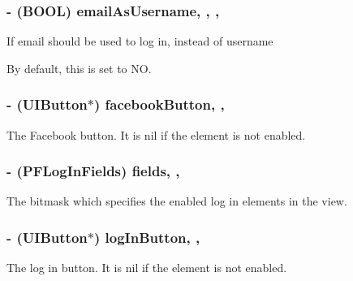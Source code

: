 \subsubsection[{email\+As\+Username}]{\setlength{\rightskip}{0pt plus 5cm}-\/ (B\+O\+O\+L) email\+As\+Username\hspace{0.3cm}{\ttfamily [read]}, {\ttfamily [write]}, {\ttfamily [nonatomic]}, {\ttfamily [assign]}}\label{interface_p_f_log_in_view_a5158167a0a95cdf25f18e5fe23a8368b}
If email should be used to log in, instead of username

By default, this is set to {\ttfamily N\+O}. \hypertarget{interface_p_f_log_in_view_afbed9acbbd4acf185fce057ab640ab23}{}
\subsubsection[{facebook\+Button}]{\setlength{\rightskip}{0pt plus 5cm}-\/ (U\+I\+Button$\ast$) facebook\+Button\hspace{0.3cm}{\ttfamily [read]}, {\ttfamily [nonatomic]}, {\ttfamily [strong]}}\label{interface_p_f_log_in_view_afbed9acbbd4acf185fce057ab640ab23}
The Facebook button. It is {\ttfamily nil} if the element is not enabled. \hypertarget{interface_p_f_log_in_view_a57c9766d511bca34b7f75fd4bd25a63d}{}
\subsubsection[{fields}]{\setlength{\rightskip}{0pt plus 5cm}-\/ (P\+F\+Log\+In\+Fields) fields\hspace{0.3cm}{\ttfamily [read]}, {\ttfamily [nonatomic]}, {\ttfamily [assign]}}\label{interface_p_f_log_in_view_a57c9766d511bca34b7f75fd4bd25a63d}
The bitmask which specifies the enabled log in elements in the view. \hypertarget{interface_p_f_log_in_view_afcadd6b2ccea1a5f06cd82c79dd675f0}{}
\subsubsection[{log\+In\+Button}]{\setlength{\rightskip}{0pt plus 5cm}-\/ (U\+I\+Button$\ast$) log\+In\+Button\hspace{0.3cm}{\ttfamily [read]}, {\ttfamily [nonatomic]}, {\ttfamily [strong]}}\label{interface_p_f_log_in_view_afcadd6b2ccea1a5f06cd82c79dd675f0}
The log in button. It is {\ttfamily nil} if the element is not enabled. \hypertarget{interface_p_f_log_in_view_af2a3676f5d1bfaa67de4b48a6bd358b7}{}
